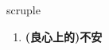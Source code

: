 
\begin{frame}
{\huge scruple}
\begin{center}
\begin{enumerate}\Large
  \item \textbf{(良心上的)不安}
\end{enumerate}
\end{center}
\end{frame}

